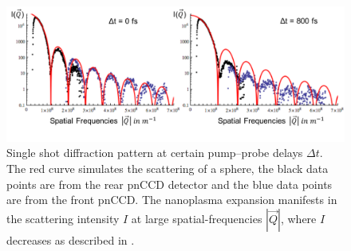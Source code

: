 \begin{figure}
	\centering
		\includegraphics[width=1.0\textwidth]{images/results/Xe-diff-pattern.png}
	\caption[Single-shot diffraction pattern of Xe-cluster at varying time delays]{Single shot diffraction pattern at certain pump--probe delays $\Delta t$. The red curve simulates the scattering of a sphere, the black data points are from the rear pnCCD detector and the blue data points are from the front pnCCD. The nanoplasma expansion manifests in the scattering intensity $I$ at large spatial-frequencies $\left|\vec{Q}\right|$, where $I$ decreases as described in \citep{Gorkhover-2016-NatPho}.}
	\label{fig:Xe-only-diff-pattern}
\end{figure}
